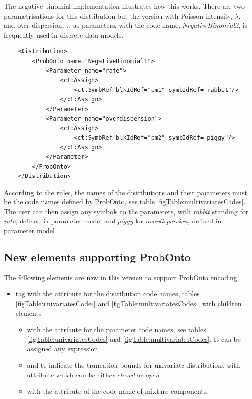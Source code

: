 \begin{example}
The negative binomial implementation illustrates how this works. There are two 
parametrisations for this distribution but the version with Poisson intensity, $\lambda$, 
and over-dispersion, $\tau$, as parameters, with the code name, \emph{NegativeBinomial2}, 
is frequently used in discrete data models.
\lstset{language=XML}
\begin{lstlisting}
    <Distribution>
        <ProbOnto name="NegativeBinomial1">
            <Parameter name="rate">
                <ct:Assign>
                    <ct:SymbRef blkIdRef="pm1" symbIdRef="rabbit"/>
                </ct:Assign>
            </Parameter>
            <Parameter name="overdispersion">
                <ct:Assign>
                    <ct:SymbRef blkIdRef="pm2" symbIdRef="piggy"/>
                </ct:Assign>
            </Parameter>
        </ProbOnto>
    </Distribution>
\end{lstlisting}
%	
According to the rules, the names of the distributions and their parameters 
must be the code names defined by ProbOnto, see table \ref{figTable:multivariatesCodes}. 
The user can then assign any symbols to the parameters,
with \emph{rabbit} standing for \emph{rate}, defined in 
parameter model  and \emph{piggy} for \emph{overdispersion}, 
defined in parameter model .
\end{example}

\subsection{New elements supporting ProbOnto}
The following elements are new in this version to support ProbOnto encoding 
\begin{itemize}
\item
{} tag with the  attribute for the distribution code names, tables 
\ref{figTable:univariatesCodes} and \ref{figTable:multivariatesCodes}, with children elements
\begin{itemize}
\item
{} with the  attribute for the parameter code names, see tables 
\ref{figTable:univariatesCodes} and \ref{figTable:multivariatesCodes}. It can be assigned any expression.
\item
{} and  to indicate the
truncation bounds for univariate distributions with attribute  which can
be either \emph{closed} or \emph{open}.
\item
{} with the  attribute of the code name of mixture 
components.
\end{itemize}
\end{itemize}



